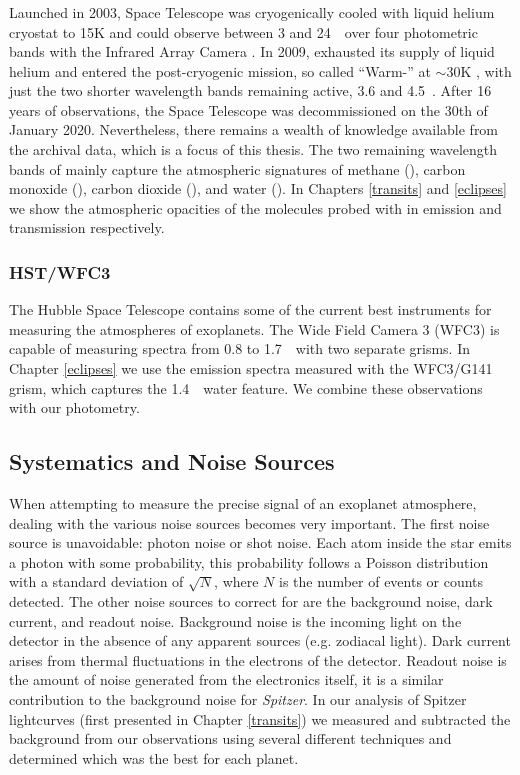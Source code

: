 \subsubsection{\spitzerIRAC}

Launched in 2003, \spitzer Space Telescope was cryogenically cooled with liquid helium cryostat to 15K and could observe between 3 and 24~\um~over four photometric bands with the Infrared Array Camera \citep[IRAC,][]{Fazio2004}. In 2009, \spitzer exhausted its supply of liquid helium and entered the post-cryogenic mission, so called ``Warm-\spitzer'' at $\sim$30K \citep{Mcmurtry2006}, with just the two shorter wavelength bands remaining active, 3.6 and 4.5~\um. After 16 years of observations, the \spitzer Space Telescope was decommissioned on the 30th of January 2020. Nevertheless, there remains a wealth of knowledge available from the archival data, which is a focus of this thesis. The two remaining wavelength bands of \spitzerIRAC mainly capture the atmospheric signatures of methane (), carbon monoxide (), carbon dioxide (), and water (). In Chapters \ref{transits} and \ref{eclipses} we show the atmospheric opacities of the molecules probed with \spitzerIRAC in emission and transmission respectively.

\subsubsection{HST/WFC3}

The Hubble Space Telescope contains some of the current best instruments for measuring the atmospheres of exoplanets. The Wide Field Camera 3 (WFC3) is capable of measuring spectra from 0.8 to 1.7~\um~with two separate grisms. In Chapter \ref{eclipses} we use the emission spectra measured with the WFC3/G141 grism, which captures the 1.4~\um~water feature. We combine these observations with our \spitzerIRAC photometry.

\subsection{Systematics and Noise Sources}

When attempting to measure the precise signal of an exoplanet atmosphere, dealing with the various noise sources becomes very important. The first noise source is unavoidable: photon noise or shot noise. Each atom inside the star emits a photon with some probability, this probability follows a Poisson distribution with a standard deviation of $\sqrt{N}$, where $N$ is the number of events or counts detected. The other noise sources to correct for are the background noise, dark current, and readout noise. Background noise is the incoming light on the detector in the absence of any apparent sources (e.g. zodiacal light). Dark current arises from thermal fluctuations in the electrons of the detector. Readout noise is the amount of noise generated from the electronics itself, it is a similar contribution to the background noise for \textit{Spitzer}. In our analysis of Spitzer lightcurves (first presented in Chapter \ref{transits}) we measured and subtracted the background from our observations using several different techniques and determined which was the best for each planet.

